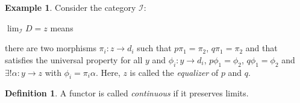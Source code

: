 \documentclass[12pt]{report}
\theoremstyle{plain}
\theoremstyle{remark}
\theoremstyle{definition}
\newtheorem{definition}[theorem]{Definition}
\newtheorem{example}[theorem]{Example}
\begin{document}
\begin{example}
    Consider the category $\mathcal{I}$:
    \begin{figure}[H]
    \centering
    \end{figure}  
    \noindent $\lim_\mathcal{I}D = z$ means
    \begin{figure}[H]
    \centering
    \end{figure}
    \noindent there are two morphisms $\pi_i:z\rightarrow d_i$ such that $p\pi_1 = \pi_2$, $q\pi_1=\pi_2$ and that satisfies the universal property for all $y$ and $\phi_i:y\rightarrow d_i$, $p\phi_1=\phi_2$, $q\phi_1=\phi_2$ and $\exists! \alpha:y\rightarrow z$ with $\phi_i=\pi_i\alpha$. Here, $z$ is called the \emph{equalizer} of $p$ and $q$.
\end{example}

\begin{definition}
    A functor is called \emph{continuous} if it preserves limits.
\end{definition}
\end{document}
